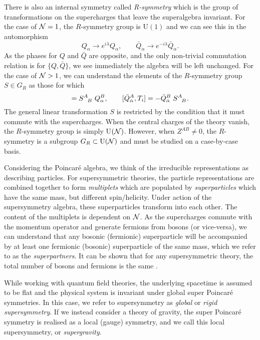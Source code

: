 There is also an internal symmetry called \emph{R-symmetry} which is the group of transformations on the supercharges that leave the superalgebra invariant. For the case of ${\cal N} = 1$, the $R$-symmetry group is U$(1)$ and we can see this in the automorphism
\begin{equation*}
	Q_\alpha \to e^{i \lambda} Q_\alpha, \qquad \bar{Q}_{\dot{\alpha}} \to e^{- i \lambda} \bar{Q}_{\dot{\alpha}}.
\end{equation*}
As the phases for $Q$ and $\bar{Q}$ are opposite, and the only non-trivial commutation relation is for $\{Q, \bar{Q}\}$, we see immediately the algebra will be left unchanged. For the case of ${\cal N} > 1$, we can understand the elements of the $R$-symmetry group $S \in G_R$ as those for which
\begin{equation*}
	[Q^A_\alpha, T_i] = \tensor{S}{^A_B} \; Q^B_\alpha, \qquad [\bar{Q}^A_{\dot{\alpha}}, T_i] =-\bar{Q}^B_{\dot{\alpha}} \; \tensor{S}{^A_B} .
\end{equation*}
The general linear transformation $S$ is restricted by the condition that it must commute with the supercharges. When the central charges of the theory vanish, the $R$-symmetry group is simply U$({\cal N})$. However, when $Z^{AB} \neq 0$, the $R$-symmetry is a subgroup $G_R \subset \text{U}({\cal N})$ and must be studied on a case-by-case basis.   

Considering the Poincar\'e algebra, we think of the irreducible representations as describing particles. For supersymmetric theories, the particle representations are combined together to form \emph{multiplets} which are populated by \emph{superparticles} which have the same mass, but different spin/helicity. Under action of the supersymmetry algebra, these superparticles transform into each other. The content of the multiplets is dependent on ${\cal N}$. As the supercharges commute with the momentum operator and generate fermions from bosons (or vice-versa), we can understand that any bosonic (fermionic) superparticle will be accompanied by at least one fermionic (bosonic) superparticle of the same mass, which we refer to as the \emph{superpartners}. It can be shown that for any supersymmetric theory, the total number of bosons and fermions is the same \cite{Wess:1992cp}. 

While working with quantum field theories, the underlying spacetime is assumed to be flat and the physical system is invariant under global super Poincar\'e symmetries. In this case, we refer to supersymmetry as \emph{global} or \emph{rigid supersymmetry}. If we instead consider a theory of gravity, the super Poincar\'e symmetry is realised as a local (gauge) symmetry, and we call this local supersymmetry, or \emph{supergravity}. 

